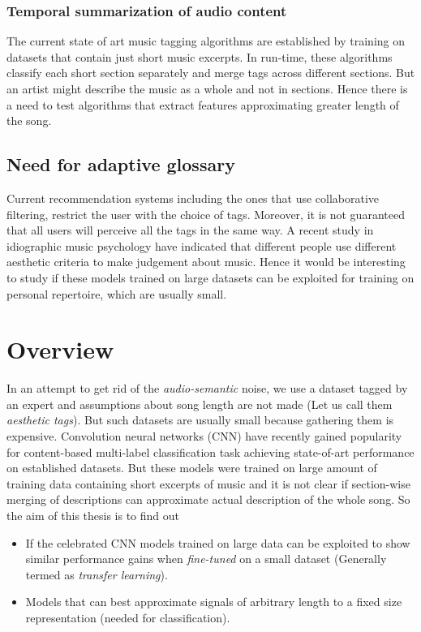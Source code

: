 \subsubsection{Temporal summarization of audio content}
The current state of art music tagging algorithms\cite{choi_crnn}\cite{MultiScale} are established by training on datasets that contain just short music excerpts. In run-time, these algorithms classify each short section separately and merge tags across different sections. But an artist might describe the music as a whole and not in sections. Hence there is a need to test algorithms that extract features approximating greater length of the song. 

\subsection{Need for adaptive glossary}
Current recommendation systems including the ones that use collaborative filtering, restrict the user with the choice of tags. Moreover, it is not guaranteed that all users will perceive all the tags in the same way. A recent study in idiographic music psychology have indicated that different people use different aesthetic criteria to make judgement about music\cite{NoAccountingForTaste}. Hence it would be interesting to study if these models \cite{choi_cnn}\cite{choi_crnn} trained on large datasets can be exploited for training on personal repertoire, which are usually small.  


\section{Overview}
\label{overview}
In an attempt to get rid of the \textit{audio-semantic} noise, we use a dataset tagged by an expert and assumptions about song length are not made (Let us call them \textit{aesthetic tags}). But such datasets are usually small because gathering them is expensive. Convolution neural networks (CNN) have recently gained popularity for content-based multi-label classification task achieving state-of-art performance\cite{choi_cnn}\cite{choi_crnn} on established datasets\cite{MSD}\cite{MTT}. But these models were trained on large amount of training data containing short excerpts of music and it is not clear if section-wise merging of descriptions can approximate actual description of the whole song. So the aim of this thesis is to find out
\begin{itemize}
\setlength\itemsep{0em}
\item If the celebrated CNN models trained on large data can be exploited to show similar performance gains when \textit{fine-tuned} on a small dataset (Generally termed as \textit{transfer learning}).
\item Models that can best approximate signals of arbitrary length to a fixed size representation (needed for classification).
\end{itemize} 
    
